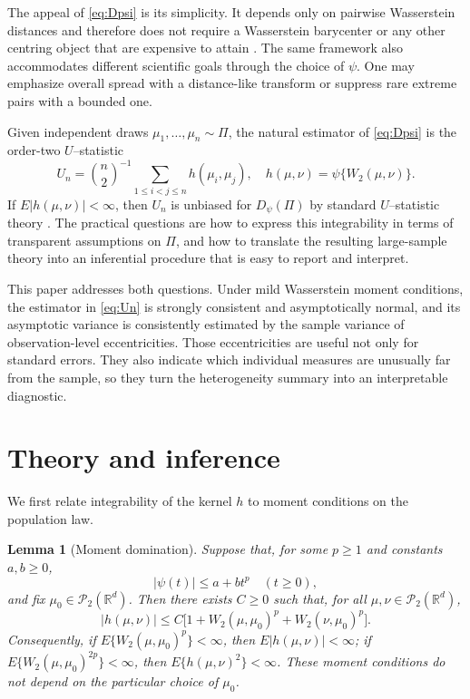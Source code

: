\documentclass[10pt]{article}
\newtheorem{lemma}[theorem]{Lemma}
\newcommand{\R}{\mathbb{R}}
\newcommand{\Ptwo}{\mathcal{P}_2(\R^d)}
\newcommand{\W}{W_2}
\begin{document}
The appeal of \eqref{eq:Dpsi} is its simplicity. It depends only on pairwise Wasserstein distances and therefore does not require a Wasserstein barycenter or any other centring object that are expensive to attain \citep{agueh_2011_BarycentersWassersteinSpace, you_2025_WassersteinMedianProbability}. The same framework also accommodates different scientific goals through the choice of $\psi$. One may emphasize overall spread with a distance-like transform or suppress rare extreme pairs with a bounded one.

Given independent draws $\mu_1,\ldots,\mu_n\sim\Pi$, the natural estimator of \eqref{eq:Dpsi} is the order-two $U$--statistic
\begin{equation}
U_n=\binom{n}{2}^{-1}\sum_{1\leq i<j\leq n} h(\mu_i,\mu_j),\quad
h(\mu,\nu)=\psi\{\W(\mu,\nu)\}.
\label{eq:Un}
\end{equation}
If $E|h(\mu,\nu)|<\infty$, then $U_n$ is unbiased for $D_{\psi}(\Pi)$ by standard $U$--statistic theory \citep{hoeffding_1948_ClassStatisticsAsymptotically,serfling_1980_ApproximationTheoremsMathematical}. The practical questions are how to express this integrability in terms of transparent assumptions on $\Pi$, and how to translate the resulting large-sample theory into an inferential procedure that is easy to report and interpret.

This paper addresses both questions. Under mild Wasserstein moment conditions, the estimator in \eqref{eq:Un} is strongly consistent and asymptotically normal, and its asymptotic variance is consistently estimated by the sample variance of observation-level eccentricities. Those eccentricities are useful not only for standard errors. They also indicate which individual measures are unusually far from the sample, so they turn the heterogeneity summary into an interpretable diagnostic.

\section{Theory and inference}

We first relate integrability of the kernel $h$ to moment conditions on the population law.

\begin{lemma}[Moment domination]\label{lem:domination}
Suppose that, for some $p\geq 1$ and constants $a,b\geq 0$,
\[
|\psi(t)|\leq a+b t^p\quad (t\geq 0),
\]
and fix $\mu_0\in\Ptwo$. Then there exists $C\geq 0$ such that, for all $\mu,\nu\in\Ptwo$,
\[
|h(\mu,\nu)|\leq C\bigl[1+\W(\mu,\mu_0)^p+\W(\nu,\mu_0)^p\bigr].
\]
Consequently, if $E\{\W(\mu,\mu_0)^p\}<\infty$, then $E|h(\mu,\nu)|<\infty$; if $E\{\W(\mu,\mu_0)^{2p}\}<\infty$, then $E\{h(\mu,\nu)^2\}<\infty$. These moment conditions do not depend on the particular choice of $\mu_0$.
\end{lemma}
\end{document}
